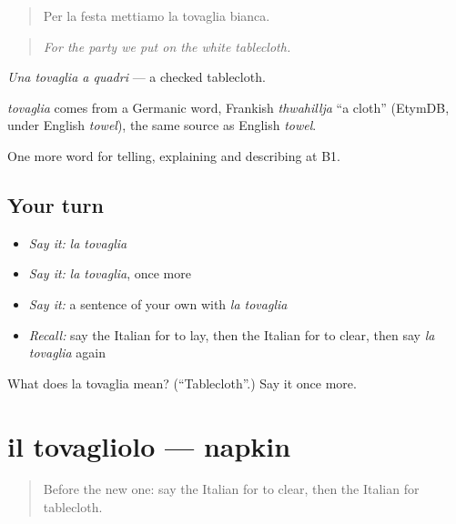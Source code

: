 \begin{quote}
Per la festa mettiamo la tovaglia bianca.
\end{quote}

\begin{quote}
\emph{For the party we put on the white tablecloth.}
\end{quote}

\emph{Una tovaglia a quadri} — a checked tablecloth.

\begin{cousinweb}
\emph{tovaglia} comes from a Germanic word, Frankish \emph{thwahillja} \textquotedblleft{}a cloth\textquotedblright{} (EtymDB, under English \emph{towel}), the same source as English \emph{towel}.
\end{cousinweb}

\begin{grammarlens}[title={What you've built}]
One more word for telling, explaining and describing at B1.
\end{grammarlens}

\subsection*{Your turn}
\begin{itemize}
\raggedright
  \item \emph{Say it:} \emph{la tovaglia}
  \item \emph{Say it:} \emph{la tovaglia}, once more
  \item \emph{Say it:} a sentence of your own with \emph{la tovaglia}
  \item \emph{Recall:} say the Italian for to lay, then the Italian for to clear, then say \emph{la tovaglia} again
\end{itemize}

\begin{tcolorbox}[breakable,colback=teal!4,colframe=teal!35!black,title={Before you move on}]
What does la tovaglia mean? (\textquotedblleft{}Tablecloth\textquotedblright{}.) Say it once more.
\end{tcolorbox}
\section[il tovagliolo]{il tovagliolo — napkin}

\label{lesson:IT-C533-tovagliolo}



\begin{quote}
Before the new one: say the Italian for to clear, then the Italian for tablecloth.
\end{quote}

